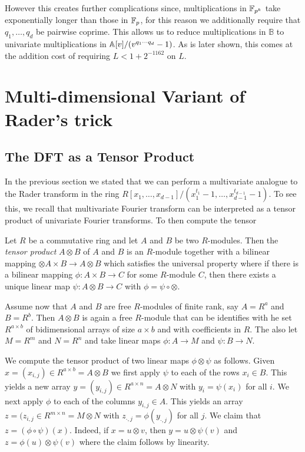 However this creates further complications since, multiplications in ${\mathbb F}_{p^k}$ take exponentially longer than those in ${\mathbb F}_p$, for this reason we additionally require that $q_1, \ldots, q_d$ be pairwise coprime. This allows us to reduce multiplications in $\mathbb{B}$ to univariate multiplications in ${\mathbb A}[v]/(v^{q_1\cdots q_d} - 1)$. As is later shown, this comes at the addition cost of requiring $L < 1 + 2^{-1162}$ on $L$.

\section{Multi-dimensional Variant of Rader's trick}%
\label{sec:multi_dimensional_variant_of_rader_s_trick}

\subsection{The DFT as a Tensor Product}%
\label{sub:the_dft_as_a_tensor_product}

In the previous section we stated that we can perform a multivariate analogue to the Rader transform in the ring $R[x_1, \ldots, x_{d-1}] / (x_1^{t_1} - 1, \ldots, x_{d-1}^{t_{d-1}} - 1)$. To see this, we recall that multivariate Fourier transform can be interpreted as a tensor product of univariate Fourier transforms. To then compute the tensor 

Let $R$ be a commutative ring and let $A$ and $B$ be two $R$-modules. Then the \emph{tensor product} $A \otimes B$ of $A$ and $B$ is an $R$-module together with a bilinear mapping $\otimes A \times B \to A \otimes B$ which satisfies the universal property where if there is a bilinear mapping $\phi: A \times B \to C$ for some $R$-module $C$, then there exists a unique linear map $\psi: A \otimes B \to C$ with $\phi = \psi \circ \otimes$.

Assume now that $A$ and $B$ are free $R$-modules of finite rank, say $A = R^a$ and $B = R^b$. Then $A \otimes B$ is again a free $R$-module that can be identifies with he set $R^{a \times b}$ of bidimensional arrays of size $a \times b$ and with coefficients in $R$. The also let $M = R^m$ and $N = R^n$ and take linear maps $\phi: A \to M$ and $\psi : B \to N$.

We compute the tensor product of two linear maps $\phi \otimes \psi$ as follows. Given $x = (x_{i,j}) \in R^{a \times b} = A \otimes B$ we first apply $\psi$ to each of the rows $x_i \in B$. This yields a new array $y = (y_{i, j}) \in R^{a \times n} = A \otimes N$ with $y_i = \psi(x_i)$ for all $i$. We next apply $\phi$ to each of the columns $y_{i, j} \in A$. This yields an array $z = (z_{i, j} \in R^{m \times n} = M \otimes N$ with $z_{\cdot , j} = \phi(y_{\cdot, j})$ for all $j$. We claim that $z = (\phi \circ \psi)(x)$. Indeed, if $x = u \otimes v$, then $y = u \otimes \psi(v)$ and $z = \phi(u) \otimes \psi(v)$ where the claim follows by linearity.

